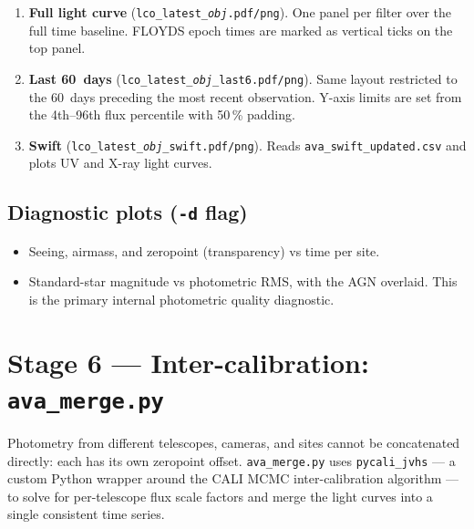 \documentclass[12pt,a4paper]{article}
\begin{document}
\begin{enumerate}
  \item \textbf{Full light curve} (\texttt{lco\_\hspace{0pt}latest\_\hspace{0pt}\textit{obj}.pdf/png}).  One panel
        per filter over the full time baseline.  FLOYDS epoch times are marked as vertical
        ticks on the top panel.
  \item \textbf{Last 60~days} (\texttt{lco\_\hspace{0pt}latest\_\hspace{0pt}\textit{obj}\_last6.pdf/png}).  Same
        layout restricted to the 60~days preceding the most recent observation.  Y-axis
        limits are set from the 4th--96th flux percentile with 50\,\% padding.
  \item \textbf{Swift} (\texttt{lco\_\hspace{0pt}latest\_\hspace{0pt}\textit{obj}\_swift.pdf/png}).  Reads
        \texttt{ava\_\hspace{0pt}swift\_\hspace{0pt}updated.csv} and plots UV and X-ray light curves.
\end{enumerate}

\subsection{Diagnostic plots (\texorpdfstring{\texttt{-d}}{-d} flag)}

\begin{itemize}[noitemsep]
  \item Seeing, airmass, and zeropoint (transparency) vs time per site.
  \item Standard-star magnitude vs photometric RMS, with the AGN overlaid.  This is the
        primary internal photometric quality diagnostic.
\end{itemize}

\section{Stage 6 --- Inter-calibration: \texorpdfstring{\texttt{ava\_merge.py}}{ava_merge.py}}
\label{sec:merge}

Photometry from different telescopes, cameras, and sites cannot be concatenated directly:
each has its own zeropoint offset.  \texttt{ava\_merge.py} uses
\texttt{pycali\_jvhs} --- a custom Python wrapper around the CALI MCMC
inter-calibration algorithm --- to solve for per-telescope flux scale factors and merge
the light curves into a single consistent time series.
\end{document}
